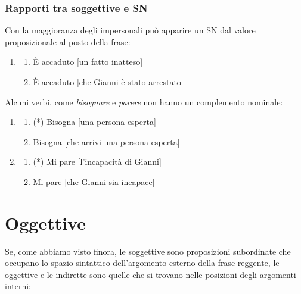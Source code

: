 \documentclass[
  a4paper,
  twoside,
  11pt,
  chapterprefix=false,
  bibliography=totocnumbered,
  listof=flat]{scrbook}
\providecommand{\tightlist}{%
  \setlength{\itemsep}{0pt}\setlength{\parskip}{0pt}}
\begin{document}
\hypertarget{rapporti-tra-soggettive-e-sn}{%
\subsubsection{Rapporti tra soggettive e SN}\label{rapporti-tra-soggettive-e-sn}}

Con la maggioranza degli impersonali può apparire un SN dal valore proposizionale al posto della frase:

\begin{enumerate}
\def\labelenumi{(\arabic{enumi})}
\setcounter{enumi}{49}
\item
  \begin{enumerate}
  \def\labelenumii{\alph{enumii}.}
  \tightlist
  \item
    È accaduto {[}un fatto inatteso{]}
  \item
    È accaduto {[}che Gianni è stato arrestato{]}
  \end{enumerate}
\end{enumerate}

Alcuni verbi, come \emph{bisognare} e \emph{parere} non hanno un complemento nominale:

\begin{enumerate}
\def\labelenumi{(\arabic{enumi})}
\setcounter{enumi}{50}
\item
  \begin{enumerate}
  \def\labelenumii{\alph{enumii}.}
  \tightlist
  \item
    (*) Bisogna {[}una persona esperta{]}
  \item
    Bisogna {[}che arrivi una persona esperta{]}
  \end{enumerate}
\item
  \begin{enumerate}
  \def\labelenumii{\alph{enumii}.}
  \tightlist
  \item
    (*) Mi pare {[}l'incapacità di Gianni{]}
  \item
    Mi pare {[}che Gianni sia incapace{]}
  \end{enumerate}
\end{enumerate}

\hypertarget{oggettive}{%
\section{Oggettive}\label{oggettive}}

Se, come abbiamo visto finora, le soggettive sono proposizioni subordinate che occupano lo spazio sintattico dell'argomento esterno della frase reggente, le oggettive e le indirette sono quelle che si trovano nelle posizioni degli argomenti interni:
\end{document}
